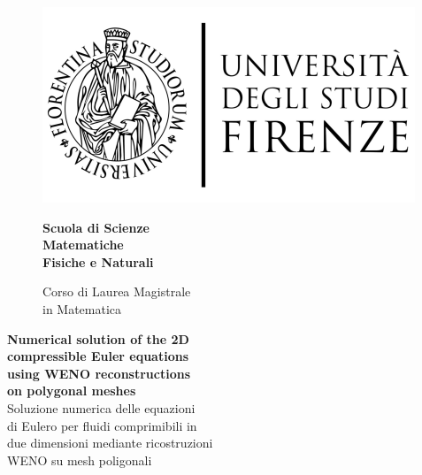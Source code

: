 \begin{titlepage}
%
\begin{figure}[htbp]
\begin{minipage}{0.58\textwidth}
\includegraphics[scale=1.1]{figures/logo.pdf}
\end{minipage}
\hfill
\begin{minipage}{0.4\textwidth}
\centering
\begin{flushright}
	{\Large \textbf{Scuola di Scienze\\ Matematiche\\ Fisiche e Naturali\\}}
\end{flushright}
\begin{flushright}
	Corso di Laurea Magistrale\\ in Matematica
\end{flushright}
\end{minipage}
\end{figure}
%
\vspace{20mm}
%
\begin{center}
	{\LARGE \textbf{Numerical solution of the 2D\\ compressible Euler equations\\
	using WENO reconstructions\\ on polygonal meshes\\}}
	\vspace{10mm}
	{\LARGE Soluzione numerica delle equazioni\\ di Eulero
	per fluidi comprimibili in\\ due dimensioni
	mediante ricostruzioni\\ WENO su mesh poligonali\\}
\end{center}
%
\vspace{25mm}
\vfill
{}

\end{titlepage}
\newpage
\restoregeometry